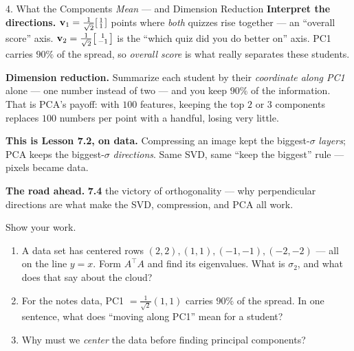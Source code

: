 \documentclass[10pt]{article}
\newcommand{\vv}{\mathbf{v}}
\newcommand{\T}{^{\top}}
\begin{document}
\begin{notesbox}{4. What the Components \emph{Mean} --- and Dimension Reduction}
\textbf{Interpret the directions.} $\vv_1=\tfrac1{\sqrt2}\begin{bsmallmatrix} 1\\1 \end{bsmallmatrix}$ points
where \emph{both} quizzes rise together --- an ``overall score'' axis. $\vv_2=\tfrac1{\sqrt2}\begin{bsmallmatrix} 1\\-1 \end{bsmallmatrix}$
is the ``which quiz did you do better on'' axis. PC1 carries $90\%$ of the spread, so \emph{overall score} is
what really separates these students.

\vspace{2pt}
\textbf{Dimension reduction.} Summarize each student by their \emph{coordinate along PC1} alone --- one number
instead of two --- and you keep $90\%$ of the information. That is PCA's payoff: with $100$ features, keeping
the top $2$ or $3$ components replaces $100$ numbers per point with a handful, losing very little.

\vspace{2pt}
\textbf{This is Lesson 7.2, on data.} Compressing an image kept the biggest-$\sigma$ \emph{layers}; PCA keeps
the biggest-$\sigma$ \emph{directions}. Same SVD, same ``keep the biggest'' rule --- pixels became data.

\vspace{2pt}
\textbf{The road ahead.} \textbf{7.4} the victory of orthogonality --- why perpendicular directions are what
make the SVD, compression, and PCA all work.
\end{notesbox}

\begin{practicebox}
Show your work.
\begin{enumerate}[leftmargin=1.6em, itemsep=4pt]
  \item A data set has centered rows $(2,2),(1,1),(-1,-1),(-2,-2)$ --- all on the line $y=x$. Form $A\T A$ and find its eigenvalues. What is $\sigma_2$, and what does that say about the cloud? \writeline
  \item For the notes data, PC1 $=\tfrac1{\sqrt2}(1,1)$ carries $90\%$ of the spread. In one sentence, what does ``moving along PC1'' mean for a student? \writeline
  \item Why must we \emph{center} the data before finding principal components? \writeline
\end{enumerate}
\end{practicebox}
\end{document}
